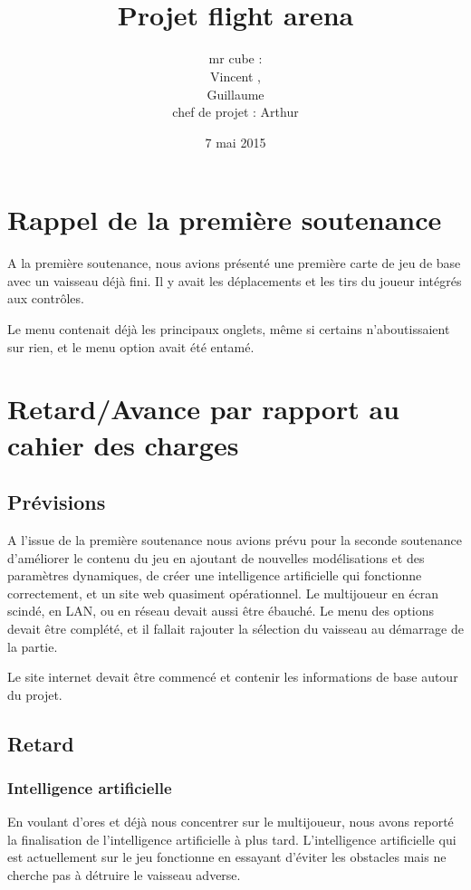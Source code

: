 \documentclass[10pt, titlepage]{report}
\title{\bsc{Rapport de la deuxième soutenance}\\Projet flight arena}
\author{mr cube :\\
Vincent \bsc{Rospini-Clerici},\\
Guillaume \bsc{Rebut}\\
chef de projet : Arthur \bsc{Remaud}}
\date{7 mai 2015}
\begin{document}
\maketitle
\renewcommand{\contentsname}{Sommaire}
\renewcommand{\chaptername}{Partie}

\tableofcontents

\chapter{Rappel de la première soutenance}

A la première soutenance, nous avions présenté une première carte de jeu de base avec un vaisseau déjà fini. Il y avait les déplacements et les tirs du joueur intégrés aux contrôles.

Le menu contenait déjà les principaux onglets, même si certains n'aboutissaient sur rien, et le menu option avait été entamé.\\

\chapter{Retard/Avance par rapport au cahier des charges}

\section{Prévisions}
A l'issue de la première soutenance nous avions prévu pour la seconde soutenance d'améliorer le contenu du jeu en ajoutant de nouvelles modélisations et des paramètres dynamiques, de créer une intelligence artificielle qui fonctionne correctement, et un site web quasiment opérationnel. Le multijoueur en écran scindé, en LAN, ou en réseau devait aussi être ébauché. Le menu des options devait être complété, et il fallait rajouter la sélection du vaisseau au démarrage de la partie.

Le site internet devait être commencé et contenir les informations de base autour du projet.\\

\section{Retard}

\subsection{Intelligence artificielle}
En voulant d'ores et déjà nous concentrer sur le multijoueur, nous avons reporté la finalisation de l'intelligence artificielle à plus tard. L'intelligence artificielle qui est actuellement sur le jeu fonctionne en essayant d'éviter les obstacles mais ne cherche pas à détruire le vaisseau adverse.\\
\end{document}
